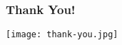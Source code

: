 \documentclass{beamer}[10]
\begin{document}
\begin{frame}[allowframebreaks]
\begin{thebibliography}{10}
%
%
%
%
%
%
%
%
%
%
%  
%
%
 \end{thebibliography}
\end{frame}
%
\begin{frame}
	\frametitle{Thank You!}
	\begin{center}
		\texttt{[image: thank-you.jpg]}
	\end{center}
\end{frame}
%
\end{document}
